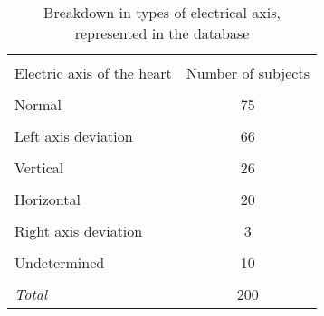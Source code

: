 \documentclass[submitted]{ieeeaccess}
\begin{document}
\begin{table}
\centering
		\caption{Breakdown in types of electrical axis, represented in the database}
		\medskip
		\begin{tabular}{|l|c|}
			\hline
			&\\[-1em]
			{Electric axis of the heart} &{Number of subjects} \\
			\hline
			&\\[-1em]
			Normal & 75 \\
			\hline
			&\\[-1em]
			Left axis deviation	 & 66 \\
			\hline
			&\\[-1em]
			Vertical & 26 \\
			\hline
			&\\[-1em]
			Horizontal & 20 \\
			\hline
			&\\[-1em]
			Right axis deviation & 3 \\
			\hline
			&\\[-1em]
			Undetermined & 10 \\
			\hline
			&\\[-1em]
			{\it Total} & 200\\
			\hline
		\end{tabular}
		\label{table3}
\end{table}
\end{document}
